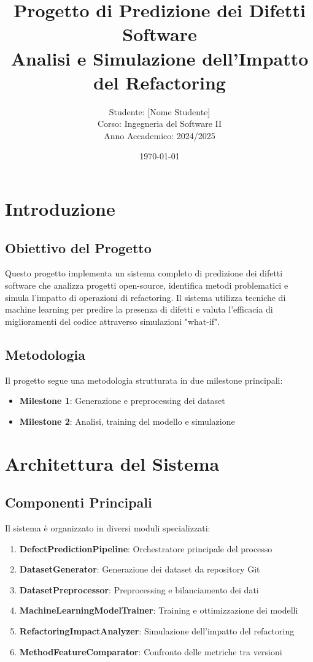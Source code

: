\documentclass[12pt,a4paper]{article}
\title{\textbf{Progetto di Predizione dei Difetti Software}\\
\large Analisi e Simulazione dell'Impatto del Refactoring}
\author{Studente: [Nome Studente]\\
Corso: Ingegneria del Software II\\
Anno Accademico: 2024/2025}
\date{\today}
\begin{document}
\maketitle

\tableofcontents
\newpage

\section{Introduzione}

\subsection{Obiettivo del Progetto}

Questo progetto implementa un sistema completo di predizione dei difetti software che analizza progetti open-source, identifica metodi problematici e simula l'impatto di operazioni di refactoring. Il sistema utilizza tecniche di machine learning per predire la presenza di difetti e valuta l'efficacia di miglioramenti del codice attraverso simulazioni "what-if".

\subsection{Metodologia}

Il progetto segue una metodologia strutturata in due milestone principali:

\begin{itemize}
    \item \textbf{Milestone 1}: Generazione e preprocessing dei dataset
    \item \textbf{Milestone 2}: Analisi, training del modello e simulazione
\end{itemize}

\section{Architettura del Sistema}

\subsection{Componenti Principali}

Il sistema è organizzato in diversi moduli specializzati:

\begin{enumerate}
    \item \textbf{DefectPredictionPipeline}: Orchestratore principale del processo
    \item \textbf{DatasetGenerator}: Generazione dei dataset da repository Git
    \item \textbf{DatasetPreprocessor}: Preprocessing e bilanciamento dei dati
    \item \textbf{MachineLearningModelTrainer}: Training e ottimizzazione dei modelli
    \item \textbf{RefactoringImpactAnalyzer}: Simulazione dell'impatto del refactoring
    \item \textbf{MethodFeatureComparator}: Confronto delle metriche tra versioni
\end{enumerate}
\end{document}
